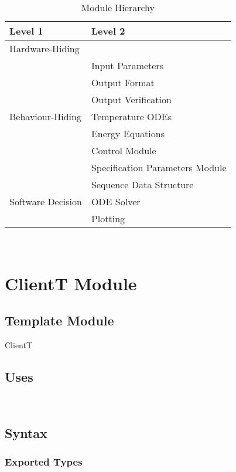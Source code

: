 \documentclass[12pt, titlepage]{article}
\begin{document}
\begin{table}[h!]
\centering
\begin{tabular}{p{} p{}}
\toprule
\textbf{Level 1} & \textbf{Level 2}\\
\midrule

{Hardware-Hiding} & ~ \\
\midrule

\multirow{7}{0.3\textwidth}{Behaviour-Hiding} & Input Parameters\\
& Output Format\\
& Output Verification\\
& Temperature ODEs\\
& Energy Equations\\ 
& Control Module\\
& Specification Parameters Module\\
\midrule

\multirow{3}{0.3\textwidth}{Software Decision} & {Sequence Data Structure}\\
& ODE Solver\\
& Plotting\\
\bottomrule

\end{tabular}
\caption{Module Hierarchy}
\label{TblMH}
\end{table}

\newpage
~\newpage


\section{ClientT Module} \label{ClientT}
\subsection{Template Module}
ClientT
\subsection{Uses}
 \\ 


\subsection{Syntax}

\subsubsection{Exported Types}
\end{document}
